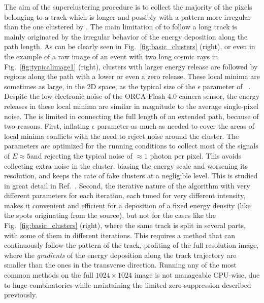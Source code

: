 The aim of the superclustering procedure is to collect the majority of
the pixels belonging to a track which is longer and possibly with a
pattern more irregular than the one clustered by \idbscan. The main
limitation of \idbscan to follow a long track is mainly originated by
the irregular behavior of the energy deposition along the path length.
As can be clearly seen in Fig.~\ref{fig:basic_clusters} (right), or
even in the example of a raw image of an event with two long cosmic
rays in Fig.~\ref{fig:typicalimage1} (right), clusters with larger
energy release are followed by regions along the path with a lower or
even a zero release.  These local minima are sometimes as large, in
the 2D space, as the typical size of the $\epsilon$ parameter of
\dbscan~\cite{dbscan}. Despite the low electronic noise of the
ORCA-Flash 4.0 camera sensor, the energy releases in these local
minima are similar in magnitude to the average single-pixel noise.
The \idbscan is limited in connecting the full length of an extended
path, because of two reasons. First, inflating $\epsilon$ parameter as
much as needed to cover the areas of local minima conflicts with the
need to reject noise around the cluster.  The \idbscan parameters are
optimized for the \lemon running conditions to collect most of the
signals of $E \approx 5$\keV and rejecting the typical noise of
$\approx 1$ photon per pixel. This avoids collecting extra noise in
the cluster, biasing the energy scale and worsening its resolution,
and keeps the rate of fake clusters at a negligible level.  This is
studied in great detail in Ref.~\cite{iDBSCAN}.  Second, the iterative
nature of the algorithm with very different parameters for each
iteration, each tuned for very different intensity, makes it
convenient and efficient for a deposition of a fixed energy density
(like the spots originating from the \fe source), but not for the cases
like the Fig.~\ref{fig:basic_clusters} (right), where the same track
is split in several parts, with some of them in different iterations.
This requires a method that can continuously follow the pattern of the
track, profiting of the full resolution image, where the {\it gradients} of
the energy deposition along the track trajectory are smaller than the
ones in the transverse direction. Running any of the most common
methods on the full $1024\times1024$ image is not manageable CPU-wise,
due to huge combinatorics while maintaining the limited zero-suppression
described previously.

